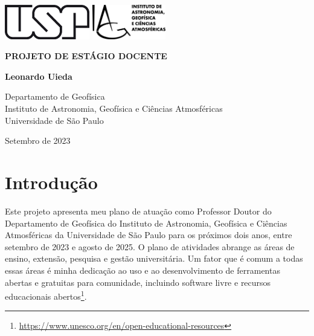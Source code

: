 \documentclass[12pt,a4paper,oneside]{book}
\newcommand{\Title}{Projeto de estágio docente}
\newcommand{\Year}{2023}
\newcommand{\Date}{Setembro de \Year{}}
\newcommand{\Author}{Leonardo Uieda}
\begin{document}
\pagestyle{empty}
\frontmatter

\begin{titlepage}
  \begin{center}
    \includegraphics[height=1.5cm]{figures/usp.png}
    \hfill
    \includegraphics[height=1.5cm]{figures/iag.png}
    \vspace{9cm}

    \textbf{\Huge \MakeUppercase{\Title{}}}
    \vspace{2cm}

    \textbf{\LARGE \Author{}}
    \vfill

    Departamento de Geofísica
    \\
    Instituto de Astronomia, Geofísica e Ciências Atmosféricas
    \\
    Universidade de São Paulo
    \vspace{2cm}

    \Date{}
  \end{center}
\end{titlepage}

\tableofcontents

\mainmatter
\pagestyle{fancy}

\chapter{Introdução}

Este projeto apresenta meu plano de atuação como Professor Doutor do
Departamento de Geofísica do Instituto de Astronomia, Geofísica e Ciências
Atmosféricas da Universidade de São Paulo para os próximos dois anos, entre
setembro de 2023 e agosto de 2025.
O plano de atividades abrange as áreas de ensino, extensão, pesquisa e gestão
universitária.
Um fator que é comum a todas essas áreas é minha dedicação ao uso e ao
desenvolvimento de ferramentas abertas e gratuitas para comunidade, incluindo
software livre e recursos educacionais
abertos\footnote{\url{https://www.unesco.org/en/open-educational-resources}}.
\end{document}
